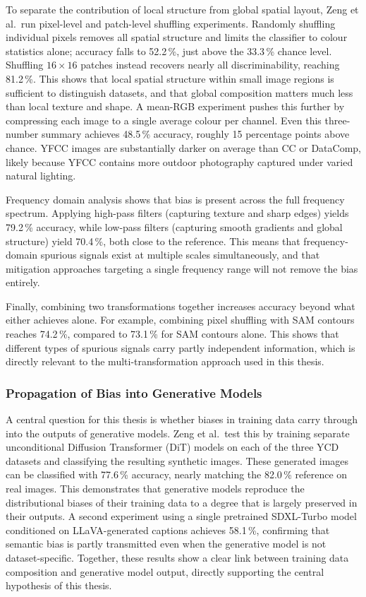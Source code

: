 To separate the contribution of local structure from global spatial layout, Zeng et al.\
run pixel-level and patch-level shuffling experiments. Randomly shuffling individual pixels
removes all spatial structure and limits the classifier to colour statistics alone; accuracy
falls to 52.2\,\%, just above the 33.3\,\% chance level. Shuffling $16\!\times\!16$ patches
instead recovers nearly all discriminability, reaching 81.2\,\%. This shows that local
spatial structure within small image regions is sufficient to distinguish datasets, and that
global composition matters much less than local texture and shape. A mean-RGB experiment
pushes this further by compressing each image to a single average colour per channel.
Even this three-number summary achieves 48.5\,\% accuracy, roughly 15 percentage points
above chance. YFCC images are substantially darker on average than CC or DataComp, likely
because YFCC contains more outdoor photography captured under varied natural lighting.

Frequency domain analysis shows that bias is present across the full frequency spectrum.
Applying high-pass filters (capturing texture and sharp edges) yields 79.2\,\% accuracy,
while low-pass filters (capturing smooth gradients and global structure) yield 70.4\,\%,
both close to the reference. This means that frequency-domain spurious signals exist at
multiple scales simultaneously, and that mitigation approaches targeting a single frequency
range will not remove the bias entirely.

Finally, combining two transformations together increases accuracy beyond what either
achieves alone. For example, combining pixel shuffling with SAM contours reaches 74.2\,\%,
compared to 73.1\,\% for SAM contours alone. This shows that different types of spurious
signals carry partly independent information, which is directly relevant to the
multi-transformation approach used in this thesis.

\subsubsection*{Propagation of Bias into Generative Models}

A central question for this thesis is whether biases in training data carry through into the
outputs of generative models. Zeng et al.\ test this by training separate unconditional
Diffusion Transformer (DiT) models on each of the three YCD datasets and classifying the
resulting synthetic images. These generated images can be classified with 77.6\,\% accuracy,
nearly matching the 82.0\,\% reference on real images. This demonstrates that generative
models reproduce the distributional biases of their training data to a degree that is largely
preserved in their outputs. A second experiment using a single pretrained SDXL-Turbo model
conditioned on LLaVA-generated captions achieves 58.1\,\%, confirming that semantic bias is
partly transmitted even when the generative model is not dataset-specific. Together, these
results show a clear link between training data composition and generative model output,
directly supporting the central hypothesis of this thesis.

